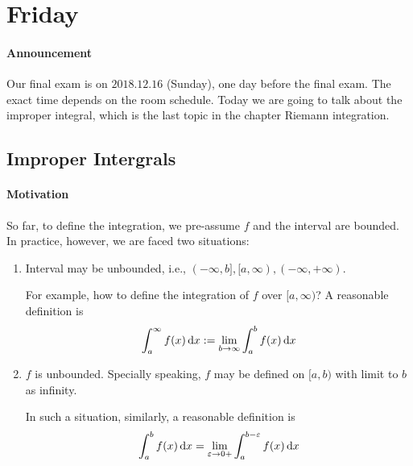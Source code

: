 
\section{Friday}
\paragraph{Announcement}
Our final exam is on $2018.12.16$ (Sunday), one day before the final exam. The exact time depends on the room schedule. Today we are going to talk about the improper integral, which is the last topic in the chapter Riemann integration.

\subsection{Improper Intergrals}
\paragraph{Motivation}
So far, to define the integration, we pre-assume $f$ and the interval are bounded. In practice, however, we are faced two situations:
\begin{enumerate}
\item
Interval may be unbounded, i.e., $(-\infty,b],[a,\infty),(-\infty,+\infty)$.

For example, how to define the integration of $f$ over $[a,\infty)$? A reasonable definition is
\[
\int_a^\infty f(x)\,\mathrm{d} x:=\lim_{b\to\infty}\int_a^bf(x)\,\mathrm{d} x
\]
\item
$f$ is unbounded. Specially speaking, $f$ may be defined on $[a,b)$ with limit to $b$ as infinity.

In such a situation, similarly, a reasonable definition is
\[
\int_a^bf(x)\,\mathrm{d} x=\lim_{\varepsilon\to0+}\int_a^{b-\varepsilon}f(x)\,\mathrm{d} x
\]
\end{enumerate}
